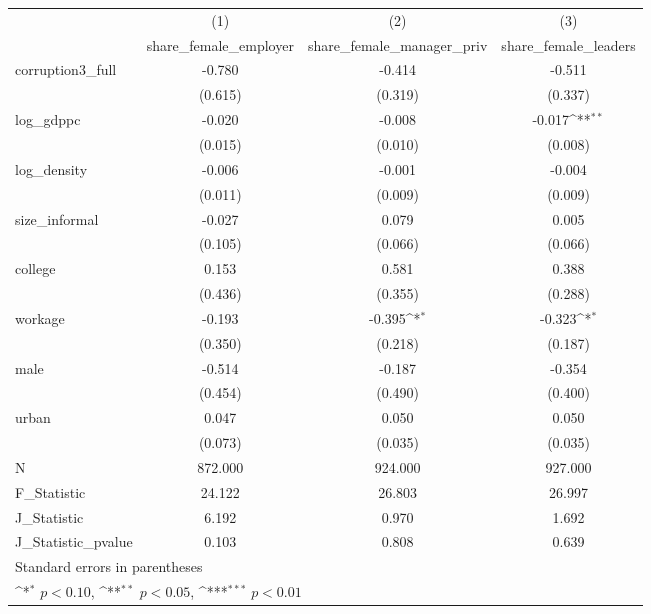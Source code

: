 {
\def\sym#1{\ifmmode^{#1}\else\(^{#1}\)\fi}
\begin{tabular}{l*{3}{c}}
\hline\hline
            &\multicolumn{1}{c}{(1)}&\multicolumn{1}{c}{(2)}&\multicolumn{1}{c}{(3)}\\
            &\multicolumn{1}{c}{share\_female\_employer}&\multicolumn{1}{c}{share\_female\_manager\_priv}&\multicolumn{1}{c}{share\_female\_leaders}\\
\hline
corruption3\_full&      -0.780         &      -0.414         &      -0.511         \\
            &     (0.615)         &     (0.319)         &     (0.337)         \\
[1em]
log\_gdppc   &      -0.020         &      -0.008         &      -0.017\sym{**} \\
            &     (0.015)         &     (0.010)         &     (0.008)         \\
[1em]
log\_density &      -0.006         &      -0.001         &      -0.004         \\
            &     (0.011)         &     (0.009)         &     (0.009)         \\
[1em]
size\_informal&      -0.027         &       0.079         &       0.005         \\
            &     (0.105)         &     (0.066)         &     (0.066)         \\
[1em]
college     &       0.153         &       0.581         &       0.388         \\
            &     (0.436)         &     (0.355)         &     (0.288)         \\
[1em]
workage     &      -0.193         &      -0.395\sym{*}  &      -0.323\sym{*}  \\
            &     (0.350)         &     (0.218)         &     (0.187)         \\
[1em]
male        &      -0.514         &      -0.187         &      -0.354         \\
            &     (0.454)         &     (0.490)         &     (0.400)         \\
[1em]
urban       &       0.047         &       0.050         &       0.050         \\
            &     (0.073)         &     (0.035)         &     (0.035)         \\
\hline
N           &     872.000         &     924.000         &     927.000         \\
F\_Statistic &      24.122         &      26.803         &      26.997         \\
J\_Statistic &       6.192         &       0.970         &       1.692         \\
J\_Statistic\_pvalue&       0.103         &       0.808         &       0.639         \\
\hline\hline
\multicolumn{4}{l}{\footnotesize Standard errors in parentheses}\\
\multicolumn{4}{l}{\footnotesize \sym{*} \(p<0.10\), \sym{**} \(p<0.05\), \sym{***} \(p<0.01\)}\\
\end{tabular}
}
